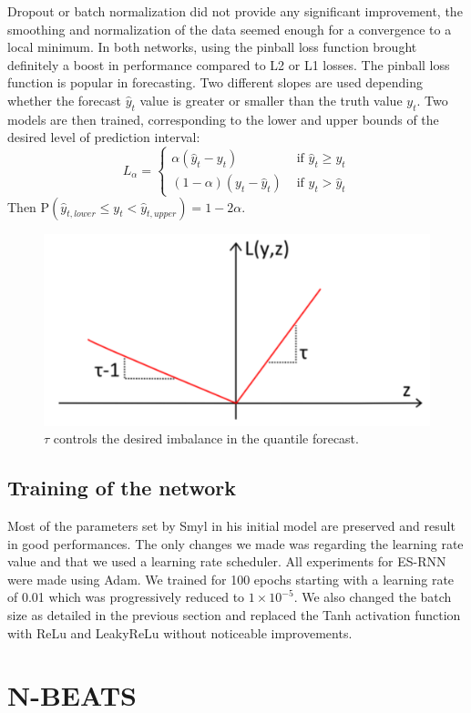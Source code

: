 \documentclass{article}
\newcommand{\p}{\mathrm{P}}
\begin{document}
Dropout or batch normalization did not provide any significant improvement, the smoothing and normalization of the data seemed enough for a convergence to a local minimum.
In both networks, using the pinball loss function brought definitely a boost in performance compared to L2 or L1 losses. The pinball loss function is popular in forecasting. 
Two different slopes are used depending whether the forecast $\hat{y}_t$ value is greater
or smaller than the truth value $y_t$. Two models are then trained, corresponding to the lower and upper bounds of the desired level of prediction interval:
\[
	L_\alpha = 
	\begin{cases}
		\alpha (\hat{y}_t  - y_t) & \text{ if } \hat{y}_t \geq y_t \\
		(1-\alpha) (y_t - \hat{y}_t) & \text{ if }  y_t > \hat{y}_t
	\end{cases}
\]
Then $\p(\hat{y}_{t, lower} \le y_t < \hat{y}_{t, upper}) = 1 - 2 \alpha$.
\begin{figure}[ht]
\centering
	\includegraphics[width=0.4\columnwidth]{pinballloss.png} 
\caption{$\tau$ controls the desired imbalance in the quantile forecast.}
\label{fig:pinballloss}
\end{figure}

\subsection{Training of the network}

Most of the parameters set by Smyl in his initial model are preserved and result in good performances. 
The only changes we made was regarding the learning rate value and that we used a learning rate scheduler.  All experiments for ES-RNN were made 
using Adam. We trained for 100 epochs starting with a learning rate of 0.01 which was progressively reduced to $1 \times 10^{-5}$.
We also changed the batch size as detailed in the previous section and replaced the Tanh activation function with ReLu and LeakyReLu without noticeable improvements.


\section{N-BEATS}
\label{NBEATS}
\end{document}
